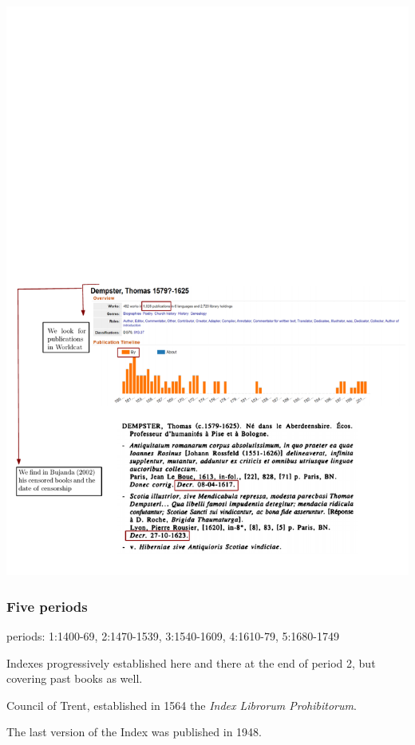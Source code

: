 \documentclass[usepdftitle=false,aspectratio=169,xcolor=dvipsnames]{beamer}
\begin{document}
	\begin{frame}

\includegraphics[width=.75\textwidth]{dempster2.pdf}

\end{frame}

	\begin{frame}
\frametitle{Five periods}

 periods: 1:1400-69, 2:1470-1539, 3:1540-1609, 4:1610-79, 5:1680-1749

 Indexes progressively established here and there at the end of period 2, but covering past books as well.

Council of Trent,  established in 1564 the \textit{Index Librorum Prohibitorum}.

The last version of the Index was published in 1948.

 \end{frame}
\end{document}

